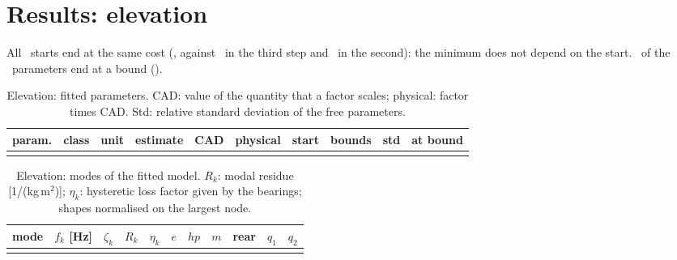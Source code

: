 \documentclass[10pt,a4paper]{article}
\numberwithin{equation}{section}
\begin{document}
\section{Results: elevation}\label{sec:res_elev}
All \nStartsP\ starts end at the same cost (\costP, against \costPStepJ\ in the third step and \costPStep\ in the second): the minimum does not depend on the start. \nBoundP\ of the \nParP\ parameters end at a bound (\boundP).

\begin{table}[H]\centering\scriptsize\setlength{\tabcolsep}{3pt}
\caption{Elevation: fitted parameters. CAD: value of the quantity that a factor scales; physical: factor times CAD. Std: relative standard deviation of the free parameters.}\label{tab:polar_params}
\begin{tabular}{lL{1.8cm}lrrL{2.2cm}L{1.7cm}lrl}\toprule
param. & class & unit & estimate & CAD & physical & start & bounds & std & at bound \\ \midrule
\\ \bottomrule
\end{tabular}\end{table}

\begin{table}[H]\centering\small\setlength{\tabcolsep}{4pt}
\caption{Elevation: modes of the fitted model. $R_k$: modal residue [1/(kg\,m$^2$)]; $\eta_k$: hysteretic loss factor given by the bearings; shapes normalised on the largest node.}\label{tab:polar_modes}
\begin{tabular}{lrrrrrrrrrr}\toprule
mode & $f_k$ [Hz] & $\zeta_k$ & $R_k$ & $\eta_k$ & $e$ & $hp$ & $m$ & rear & $q_1$ & $q_2$ \\ \midrule
\\ \bottomrule
\end{tabular}\end{table}
\end{document}
